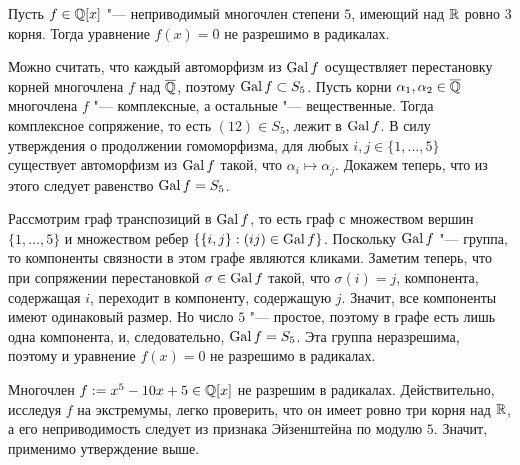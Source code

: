 \Cor
	Пусть $f \in \mathbb{Q}[x]$ "--- неприводимый многочлен степени $5$, имеющий над $\mathbb{R}$ ровно $3$ корня. Тогда уравнение $f(x) = 0$ не разрешимо в радикалах.

\Proof
	Можно считать, что каждый автоморфизм из $\operatorname{Gal}{f}$ осуществляет перестановку корней многочлена $f$ над $\overline{\mathbb{Q}}$, поэтому $\operatorname{Gal}{f} \subset S_5$. Пусть корни $\alpha_1, \alpha_2 \in \overline{\mathbb{Q}}$ многочлена $f$ "--- комплексные, а остальные "--- вещественные. Тогда комплексное сопряжение, то есть $(12) \in S_5$, лежит в $\operatorname{Gal}{f}$. В силу утверждения о продолжении гомоморфизма, для любых $i, j \in \{1, \dotsc, 5\}$ существует автоморфизм из $\operatorname{Gal}{f}$ такой, что $\alpha_i \mapsto \alpha_j$. Докажем теперь, что из этого следует равенство $\operatorname{Gal}{f} = S_5$.
	
	Рассмотрим граф транспозиций в $\operatorname{Gal}{f}$, то есть граф с множеством вершин $\{1, \dotsc, 5\}$ и множеством ребер $\{\{i, j\} : (ij) \in \operatorname{Gal}{f}\}$. Поскольку $\operatorname{Gal}{f}$ "--- группа, то компоненты связности в этом графе являются кликами. Заметим теперь, что при сопряжении перестановкой $\sigma \in \operatorname{Gal}{f}$ такой, что $\sigma(i) = j$, компонента, содержащая $i$, переходит в компоненту, содержащую $j$. Значит, все компоненты имеют одинаковый размер. Но число $5$ "--- простое, поэтому в графе есть лишь одна компонента, и, следовательно, $\operatorname{Gal}{f} = S_5$. Эта группа неразрешима, поэтому и уравнение $f(x) = 0$ не разрешимо в радикалах.
\EndProof

\Example
	Многочлен $f := x^5 - 10x + 5 \in \mathbb{Q}[x]$ не разрешим в радикалах. Действительно, исследуя $f$ на экстремумы, легко проверить, что он имеет ровно три корня над $\mathbb{R}$, а его неприводимость следует из признака Эйзенштейна по модулю $5$. Значит, применимо утверждение выше.